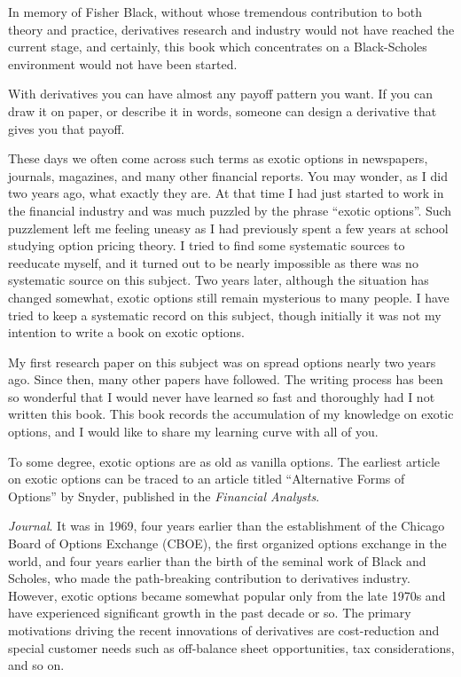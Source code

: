 In memory of Fisher Black,  without whose tremendous contribution to
both theory and practice, derivatives research and industry would
not have reached the current stage, and certainly, this book which
concentrates on a Black-Scholes environment would not have been started.

With derivatives you can have almost any payoff pattern you want. 
If you can draw it on paper, or describe it in words, someone  can
design a derivative that gives you that payoff.

These days we often come across such terms as exotic options in
newspapers, journals, magazines, and many other financial reports.
You may wonder, as I did two years ago, what exactly they are. At
that time I had just started to work in the financial industry and
was much puzzled by the phrase ``exotic options''. Such puzzlement
left me feeling uneasy as I had  previously spent a few years at
school studying option pricing theory. I tried to find some
systematic sources to reeducate myself, and it turned out to be
nearly impossible as there was no systematic source on this subject.
Two years later, although the situation has changed  somewhat, exotic
options still remain mysterious to many people. I have tried to keep
a systematic record on this subject, though initially it was not my
intention to write a book on exotic options.

My first research paper on this subject was on spread options nearly
two years ago. Since then,  many other papers have followed. The
writing process has been so wonderful that I would never have learned
so fast and thoroughly had I not written this book. This book records
the accumulation of my knowledge on exotic options, and I would like
to share my learning curve with all of you.

To some degree, exotic options are as old as vanilla options. The
earliest article on exotic options can be traced to an article titled
``Alternative Forms of Options'' by Snyder, published in the {\it
Financial Analysts}.

{\it Journal}. It was in 1969, four years earlier than
the establishment of the Chicago Board of Options Exchange (CBOE),
the first organized options exchange in the world, and four years
earlier than the birth of the seminal work of Black and Scholes, who
made the path-breaking contribution to derivatives industry. However,
exotic options became somewhat popular only from the late 1970s and
have experienced significant growth in the past decade or so. The
primary motivations driving the recent innovations of derivatives are
cost-reduction and special customer needs such as off-balance sheet
opportunities, tax considerations, and so on.

